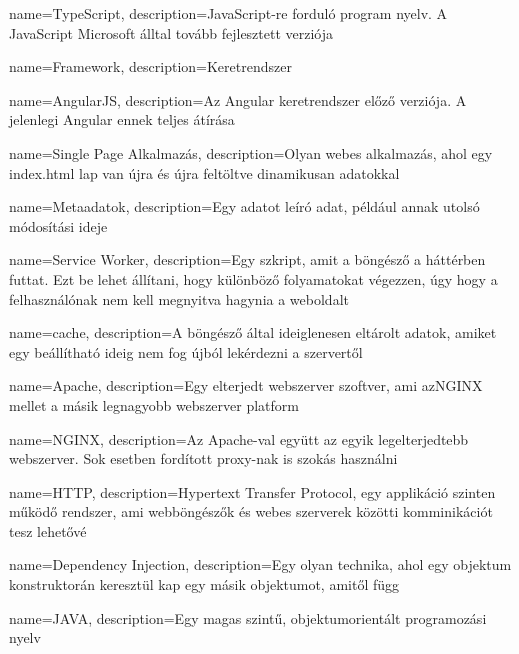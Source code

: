 {
        name=TypeScript,
        description={JavaScript-re forduló program nyelv. A JavaScript Microsoft álltal tovább fejlesztett verziója}
}

{
        name=Framework,
        description={Keretrendszer}
}

{
        name=AngularJS,
        description={Az Angular keretrendszer előző verziója. A jelenlegi Angular ennek teljes átírása}
}

{
        name=Single Page Alkalmazás,
        description={Olyan webes alkalmazás, ahol egy index.html lap van újra és újra feltöltve dinamikusan adatokkal}
}

{
        name=Metaadatok,
        description={Egy adatot leíró adat, például annak utolsó módosítási ideje}
}

{
        name=Service Worker,
        description={Egy szkript, amit a böngésző a háttérben futtat. 
        Ezt be lehet állítani, hogy különböző folyamatokat végezzen, úgy hogy a felhasználónak nem kell megnyitva hagynia a weboldalt}
}

{
        name=cache,
        description={A böngésző által ideiglenesen eltárolt adatok, amiket egy beállítható ideig nem fog újból lekérdezni a szervertől}
}

{
        name=Apache,
        description={Egy elterjedt webszerver szoftver, ami az\Gls{NGINX} mellet a másik legnagyobb webszerver platform}
}

{
        name=NGINX,
        description={Az \Gls{Apache}-val együtt az egyik legelterjedtebb webszerver. Sok esetben fordított proxy-nak is szokás használni}
}

{
        name=HTTP,
        description={Hypertext Transfer Protocol, egy applikáció szinten működő rendszer, ami webböngészők és webes szerverek közötti komminikációt tesz lehetővé}
}

{
        name=Dependency Injection,
        description={Egy olyan technika, ahol egy objektum konstruktorán keresztül kap egy másik objektumot, amitől függ}
}

{
        name=JAVA,
        description={Egy magas szintű, objektumorientált programozási nyelv}
}


